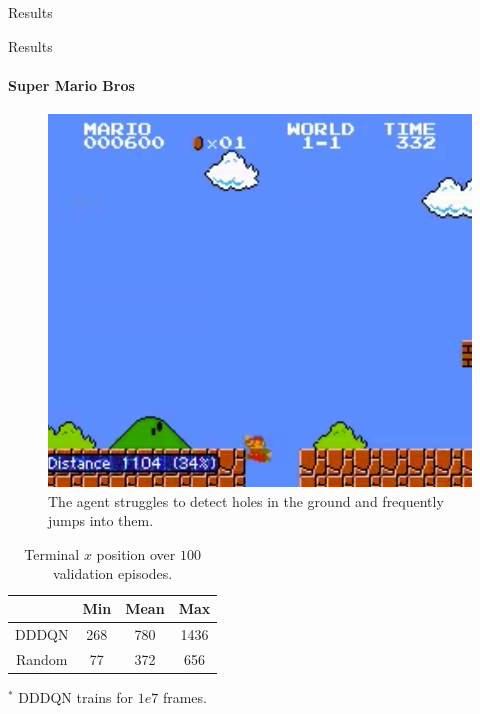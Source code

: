 \documentclass{beamer}
\begin{document}
\begin{frame}{Results}
\end{frame}



\begin{frame}{Results}
\framesubtitle{Super Mario Bros}
\begin{minipage}{\textwidth}
%
\begin{minipage}{0.4\textwidth}
\begin{figure}
\includegraphics[width=\textwidth]{img/smb_clip}
\caption*{The agent struggles to detect holes in the ground and frequently
jumps into them.}
\end{figure}
\end{minipage}
%
\hfill
%
\begin{minipage}{0.5\textwidth}
    \begin{table}
    \centering
    \caption{Terminal $x$ position over $100$ validation episodes.}
    \begin{threeparttable}
    \begin{tabular}{||c c c c||}
    \hline
    & Min & Mean & Max \\ [0.5ex]
    \hline\hline
    DDDQN & 268 & 780 & 1436 \\
    \hline
    Random & 77 & 372 & 656 \\
    \hline
    \end{tabular}
    \begin{tablenotes}
        \small
        \item $^*$ DDDQN trains for $1e7$ frames.
    \end{tablenotes}
    \end{threeparttable}
    \end{table}
\end{minipage}
%
\end{minipage}
\end{frame}
\end{document}
